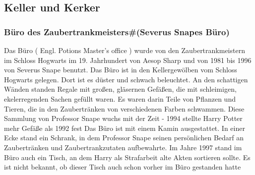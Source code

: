 \documentclass[a4paper, 10pt]{article}
\begin{document}
\subsection*{\Large Keller und Kerker}
\subsubsection*{\large Büro des Zaubertrankmeisters#(Severus Snapes Büro)}
Das Büro (  Engl.  Potions Master's office ) wurde von den Zaubertrankmeistern im Schloss Hogwarts im 19. Jahrhundert von Aesop Sharp und von 1981 bis 1996 von Severus Snape benutzt. Das Büro ist in den Kellergewölben vom Schloss Hogwarts gelegen. Dort ist es düster und schwach beleuchtet. An den schattigen Wänden standen Regale mit großen, gläsernen Gefäßen, die mit schleimigen, ekelerregenden Sachen gefüllt waren. Es waren darin Teile von Pflanzen und Tieren, die in den Zaubertränken von verschiedenen Farben schwammen. Diese Sammlung von Professor Snape wuchs mit der Zeit - 1994 stellte Harry Potter mehr Gefäße als 1992 fest
\vspace{10pt}
\newline
Das Büro ist mit einem Kamin ausgestattet. In einer Ecke stand ein Schrank, in dem Professor Snape seinen persönlichen Bedarf an Zaubertränken und Zaubertrankzutaten aufbewahrte. Im Jahre 1997 stand im Büro auch ein Tisch, an dem Harry als Strafarbeit alte Akten sortieren sollte. Es ist nicht bekannt, ob dieser Tisch auch schon vorher im Büro gestanden hatte
\end{document}
